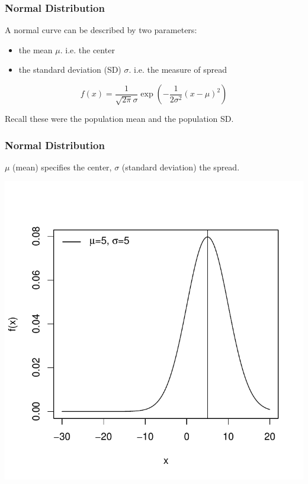 \documentclass[handout]{beamer}
\newcommand{\blue}[1]{\textcolor{blue2}{#1}}
\begin{document}
\begin{frame}[fragile]
\frametitle{Normal Distribution}

A normal curve can be described by two \blue{parameters}:
\begin{itemize}
\item the \blue{mean $\mu$}. i.e. the center
\item the \blue{standard deviation (SD) $\sigma$}. i.e. the measure of spread
\end{itemize}

\pause\vspace{0.25cm}

\[
f(x) = \frac{1}{\sqrt{2\pi}\sigma}\exp\left( -\frac{1}{2\sigma^2}(x-\mu)^2 \right)
\]


\pause\vspace{0.25cm}

Recall these were the \blue{population mean} and the \blue{population SD}.

\end{frame}


\begin{frame}
\frametitle{Normal Distribution}
$\mu$ (mean) specifies the center, $\sigma$ (standard deviation) the spread.
\begin{center}
\includegraphics{figure/lec02-003}
\end{center}
\end{frame}
\end{document}
